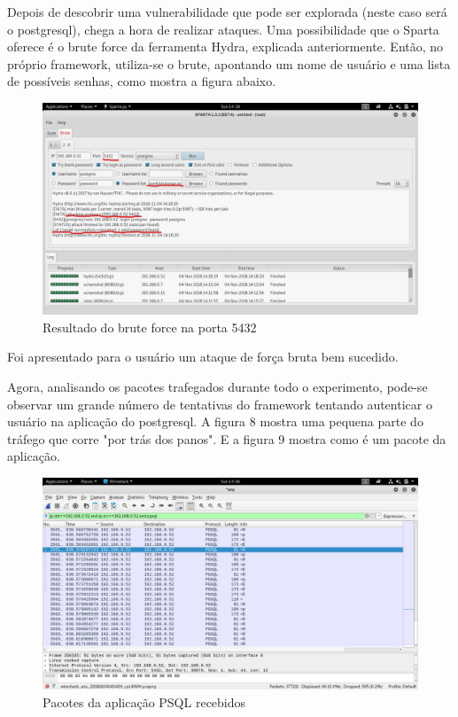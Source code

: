 \documentclass[journal]{IEEEtran}
\begin{document}
Depois de descobrir uma vulnerabilidade que pode ser explorada (neste caso será o postgresql), chega a hora de realizar ataques. Uma possibilidade que o Sparta oferece é o brute force da ferramenta Hydra, explicada anteriormente. Então, no próprio framework, utiliza-se o brute, apontando um nome de usuário e uma lista de possíveis senhas, como mostra a figura abaixo.
\par

\begin{figure}[h!]
	\includegraphics[width=\linewidth]{../Inkedpassword_found_brute.jpg}
	\caption{Resultado do brute force na porta 5432}
	\label{fig:brute_force_results}
\end{figure}

Foi apresentado para o usuário um ataque de força bruta bem sucedido.\par 
Agora, analisando os pacotes trafegados durante todo o experimento, pode-se observar um grande número de tentativas do framework tentando autenticar o usuário na aplicação do postgresql. A figura 8 mostra uma pequena parte do tráfego que corre "por trás dos panos". E a figura 9 mostra como é um pacote da aplicação.
\par 

\begin{figure}[h!]
	\includegraphics[width=\linewidth]{../pgsql_packets_wireshark.png}
	\caption{Pacotes da aplicação PSQL recebidos}
	\label{fig:psql_packets}
\end{figure}
\end{document}
